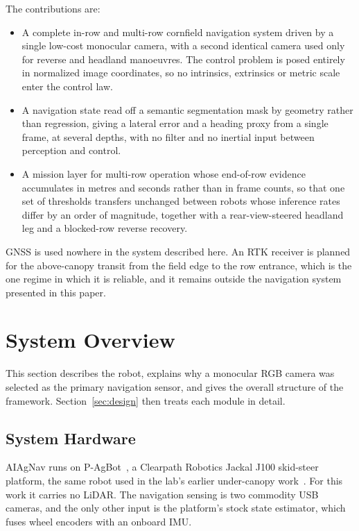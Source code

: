\documentclass[conference]{IEEEtran}
\begin{document}
The contributions are:

\begin{itemize}
\item A complete in-row and multi-row cornfield navigation system driven by a
single low-cost monocular camera, with a second identical camera used only for
reverse and headland manoeuvres. The control problem is posed entirely in
normalized image coordinates, so no intrinsics, extrinsics or metric scale enter
the control law.
\item A navigation state read off a semantic segmentation mask by geometry
rather than regression, giving a lateral error and a heading proxy from a single
frame, at several depths, with no filter and no inertial input between
perception and control.
\item A mission layer for multi-row operation whose end-of-row evidence
accumulates in metres and seconds rather than in frame counts, so that one set
of thresholds transfers unchanged between robots whose inference rates differ by
an order of magnitude, together with a rear-view-steered headland leg and a
blocked-row reverse recovery.
\end{itemize}

GNSS is used nowhere in the system described here. An RTK receiver is planned
for the above-canopy transit from the field edge to the row entrance, which is
the one regime in which it is reliable, and it remains outside the navigation
system presented in this paper.

\section{System Overview}
This section describes the robot, explains why a monocular RGB camera was
selected as the primary navigation sensor, and gives the overall structure of
the framework. Section~\ref{sec:design} then treats each module in detail.

\subsection{System Hardware}
AIAgNav runs on P-AgBot~\cite{kim2022pagbot}, a Clearpath Robotics Jackal J100
skid-steer platform, the same robot used in the lab's earlier under-canopy
work~\cite{kim2024pagslam,kim2025pagnav}. For this work it carries no LiDAR. The
navigation sensing is two commodity USB cameras, and the only other input is the
platform's stock state estimator, which fuses wheel encoders with an onboard
IMU.
\end{document}
